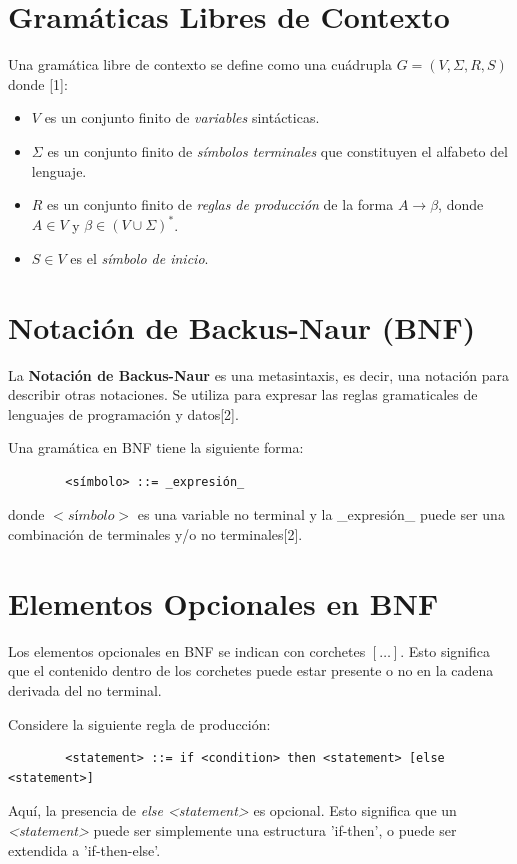 \documentclass[11pt]{article} %
\begin{document}
	\section{Gramáticas Libres de Contexto}
	Una gramática libre de contexto se define como una cuádrupla \( G = (V, \Sigma, R, S) \) donde [1]:
	\begin{itemize}
		\item \( V \) es un conjunto finito de \textit{variables} sintácticas.
		\item \( \Sigma \) es un conjunto finito de \textit{símbolos terminales} que constituyen el alfabeto del lenguaje.
		\item \( R \) es un conjunto finito de \textit{reglas de producción} de la forma \( A \rightarrow \beta \), donde \( A \in V \) y \( \beta \in (V \cup \Sigma)^* \).
		\item \( S \in V \) es el \textit{símbolo de inicio}.
	\end{itemize}
	
	\section{Notación de Backus-Naur (BNF)}
	La \textbf{Notación de Backus-Naur} es una metasintaxis, es decir, una notación para describir otras notaciones. Se utiliza para expresar las reglas gramaticales de lenguajes de programación y datos[2].
	
	Una gramática en BNF tiene la siguiente forma:
	\begin{verbatim}
		<símbolo> ::= _expresión_
	\end{verbatim}
	donde \( <símbolo> \) es una variable no terminal y la \_expresión\_ puede ser una combinación de terminales y/o no terminales[2].
	
	
	\section{Elementos Opcionales en BNF}
	Los elementos opcionales en BNF se indican con corchetes \([ \ldots ]\). Esto significa que el contenido dentro de los corchetes puede estar presente o no en la cadena derivada del no terminal.
	
	Considere la siguiente regla de producción:
	\begin{verbatim}
		<statement> ::= if <condition> then <statement> [else <statement>]
	\end{verbatim}
	Aquí, la presencia de \textit{else <statement>} es opcional. Esto significa que un \textit{<statement>} puede ser simplemente una estructura 'if-then', o puede ser extendida a 'if-then-else'.
	
\end{document}
